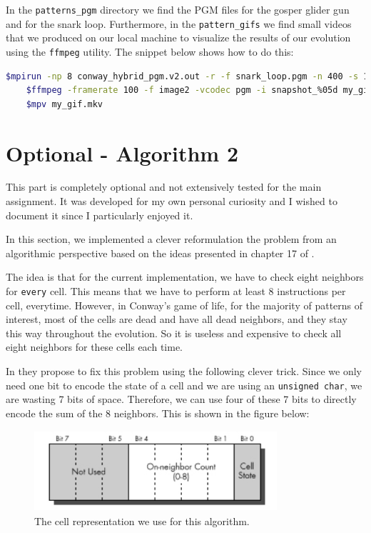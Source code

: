 \documentclass{report}
\begin{document}
In the \texttt{patterns\_pgm} directory we find the PGM files for the gosper glider gun and 
for the snark loop. Furthermore, in the \texttt{pattern\_gifs} we find small videos 
that we produced on our local machine to visualize the results of our evolution 
using the \texttt{ffmpeg} utility. The snippet below shows how to do this: 

\begin{lstlisting}[language=bash]
    $mpirun -np 8 conway_hybrid_pgm.v2.out -r -f snark_loop.pgm -n 400 -s 1 -e 1 
    $ffmpeg -framerate 100 -f image2 -vcodec pgm -i snapshot_%05d my_gif.mkv
    $mpv my_gif.mkv
\end{lstlisting}

\section{Optional - Algorithm 2}

This part is completely optional and not extensively tested for the main 
assignment. It was developed for my own personal curiosity and I wished to 
document it since I particularly enjoyed it. 

In this section, we implemented a clever reformulation the problem from an 
algorithmic perspective based on the ideas presented in chapter 17 of 
\cite{algo2}. 

The idea is that for the current implementation, we have to check eight neighbors 
for \texttt{every} cell. This means that we have to perform at least 8 instructions 
per cell, everytime. However, in Conway's game of life, for the majority of 
patterns of interest, most of the cells are dead and have all dead neighbors, 
and they stay this way throughout the evolution. So it is useless and expensive
to check all eight neighbors for these cells each time.

In \cite{algo2} they propose to fix this problem using the following clever trick. 
Since we only need one bit to encode the state of a cell and we are using an 
\texttt{unsigned char}, we are wasting 7 bits 
of space. Therefore, we can use four of these 7 bits to directly encode the 
sum of the 8 neighbors. This is shown in the figure below:

\begin{figure}[H]
    \centering
    \includegraphics[width=9cm, height=3cm]{./other_images/new_cell_rep.png}
    \caption{\label{fig:mpi_multiple} The cell representation we use for this 
    algorithm. }
\end{figure}
\end{document}
